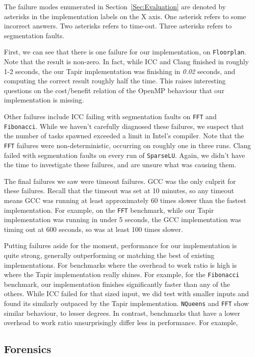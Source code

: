 \documentclass[sigconf]{acmart}
\begin{document}
The failure modes enumerated in Section~\ref{Sec:Evaluation} are denoted by 
asterisks in the implementation labels on the X axis. One asterisk refers to
some incorrect answers. Two asterisks refers to time-out. Three asterisks
refers to segmentation faults.

First, we can see that there is one failure for our implementation, on
\texttt{Floorplan}. Note that the result is non-zero. In fact, while ICC and
Clang finished in roughly 1-2 seconds, the our Tapir implementation was
finishing in \emph{0.02} seconds, and computing the correct result roughly half
the time. This raises interesting questions on the cost/benefit relation of the
OpenMP behaviour that our implementation is missing.

Other failures include ICC failing with segmentation faults on \texttt{FFT} and
\texttt{Fibonacci}. While we haven't carefully diagnosed these failures, we 
suspect that the number of tasks spawned exceeded a limit in Intel's compiler.
Note that the \texttt{FFT} failures were non-deterministic, occurring on
roughly one in three runs. Clang failed with segmentation faults on every run 
of \texttt{SparseLU}. Again, we didn't have the time to investigate these
failures, and are unsure what was causing them.

The final failures we saw were timeout failures. GCC was the only culprit for these
failures. Recall that the timeout was set at 10 minutes, so any timeout means GCC 
was running at least approximately 60 times slower than the fastest implementation. 
For example, on the \texttt{FFT} benchmark, while our Tapir implementation was running
in under 5 seconds, the GCC implementation was timing out at 600 seconds, so
was at least 100 times slower.

Putting failures aside for the moment, performance for our implementation is
quite strong, generally outperforming or matching the best of existing
implementations. For benchmarks where the overhead to work ratio is high is 
where the Tapir implementation really shines. For example, for the
\texttt{Fibonacci} benchmark, our implementation finishes significantly faster
than any of the others. While ICC failed for that sized input, we did test with
smaller inputs and found its similarly outpaced by the Tapir implementation.
\texttt{NQueens} and \texttt{FFT} show similar behaviour, to lesser degrees. In 
contrast, benchmarks that have a lower overhead to work ratio unsurprisingly 
differ less in performance. For example,  

\subsection{Forensics}
\end{document}
